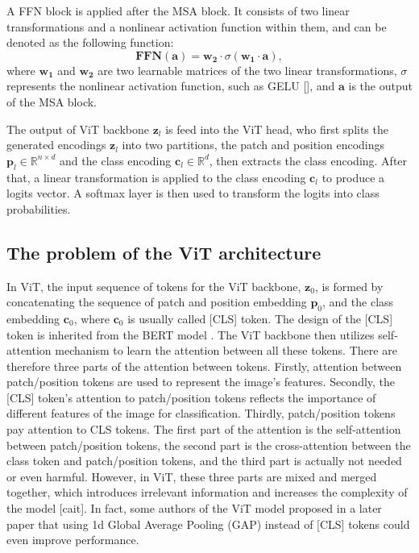 \documentclass[anon,12pt]{colt2024} %
\begin{document}
A FFN block is applied after the MSA block. It consists of two linear transformations and a nonlinear activation function within them, and can be denoted as the following function:
\begin{equation}
  \mathbf{FFN}(\mathbf{a}) = \mathbf{w_2} \cdot \sigma(\mathbf{w_1} \cdot \mathbf{a}),
\end{equation}
where $\mathbf{w_1}$ and $\mathbf{w_2}$ are two learnable matrices of the two linear transformations, $\sigma$ represents the nonlinear activation function, such as GELU [], and  $\mathbf{a}$ is the output of the MSA block.

The output of ViT backbone $\mathbf{z}_l$ is feed into the ViT head, who first splits the generated encodings $\mathbf{z}_l$ into two partitions, the patch and position encodings $\mathbf{p}_l \in \mathbb{R} ^ {n \times d}$ and the class encoding $\mathbf{c}_l \in \mathbb{R}^d$, then extracts the class encoding.
After that, a linear transformation is applied to the class encoding $\mathbf{c}_l$ to produce a logits vector. A softmax layer is then used to transform the logits into class probabilities.

\subsection{The problem of the ViT architecture}

In ViT, the input sequence of tokens for the ViT backbone, $\mathbf{z}_0$, is formed by concatenating the sequence of patch and position embedding  $\mathbf{p}_0$, and the class embedding  $\mathbf{c}_0$, where $\mathbf{c}_0$ is usually called [CLS] token.
The design of the [CLS] token is inherited from the BERT model \cite{devlin2018bert}.%
The ViT backbone then utilizes self-attention mechanism to learn the attention between all these tokens.
There are therefore three parts of the attention between tokens. Firstly, attention between patch/position tokens are used to represent the image's features. Secondly, the [CLS] token's attention to patch/position tokens reflects the importance of different features of the image for classification. Thirdly, patch/position tokens pay attention to CLS tokens.
The first part of the attention is the self-attention between patch/position tokens, the second part is the cross-attention between the class token and patch/position tokens, and the third part is actually not needed or even harmful.
However, in ViT, these three parts are mixed and merged together, which introduces irrelevant information and increases the complexity of the model [cait].
In fact, some authors of the ViT model proposed in a later paper \cite{beyer2022better} that using 1d Global Average Pooling (GAP) instead of [CLS] tokens could even improve performance.
\end{document}
